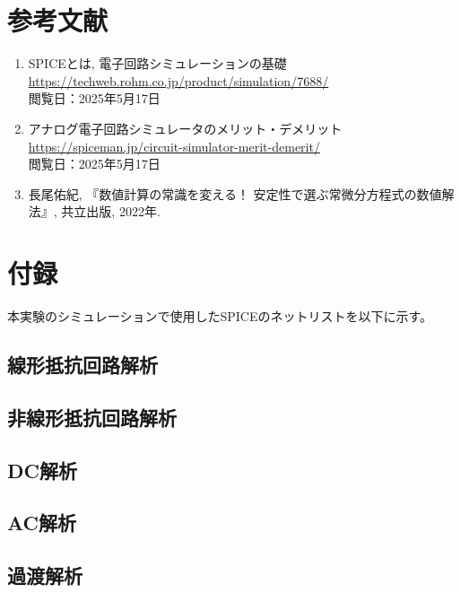 \documentclass{jlreq}
\numberwithin{equation}{section}
\begin{document}
\section{参考文献}
\begin{enumerate}
  \item SPICEとは, 電子回路シミュレーションの基礎 \\
    \url{https://techweb.rohm.co.jp/product/simulation/7688/}\\
    閲覧日：2025年5月17日
  \item アナログ電子回路シミュレータのメリット・デメリット \\
    \url{https://spiceman.jp/circuit-simulator-merit-demerit/}\\
    閲覧日：2025年5月17日
  \item 長尾佑紀, 『数値計算の常識を変える！ 安定性で選ぶ常微分方程式の数値解法』, 共立出版, 2022年.
\end{enumerate}

\section{付録}
本実験のシミュレーションで使用したSPICEのネットリストを以下に示す。
\subsection{線形抵抗回路解析}

\subsection{非線形抵抗回路解析}

\subsection{DC解析}

\subsection{AC解析}

\subsection{過渡解析}
\end{document}
